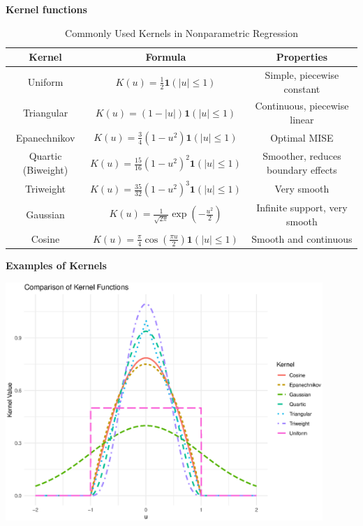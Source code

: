\documentclass[19pt,landscape]{article}
\begin{document}
\newpage
{\LARGE\centerline{\textbf{Kernel functions}}}
\vskip25pt
\begin{table}[h!]
    \centering
    \renewcommand{\arraystretch}{2} %
    \begin{tabular}{|c|c|c|}
        \hline
        \textbf{Kernel} & \textbf{Formula} & \textbf{Properties} \\
        \hline
        Uniform & \( K(u) = \frac{1}{2} \mathbf{1}(|u| \leq 1) \) & Simple, piecewise constant \\
        \hline
        Triangular & \( K(u) = (1 - |u|) \mathbf{1}(|u| \leq 1) \) & Continuous, piecewise linear \\
        \hline
        Epanechnikov & \( K(u) = \frac{3}{4} (1 - u^2) \mathbf{1}(|u| \leq 1) \) & Optimal MISE \\
        \hline
        Quartic (Biweight) & \( K(u) = \frac{15}{16} (1 - u^2)^2 \mathbf{1}(|u| \leq 1) \) & Smoother, reduces boundary effects \\
        \hline
        Triweight & \( K(u) = \frac{35}{32} (1 - u^2)^3 \mathbf{1}(|u| \leq 1) \) & Very smooth \\
        \hline
        Gaussian & \( K(u) = \frac{1}{\sqrt{2\pi}} \exp\left(-\frac{u^2}{2}\right) \) & Infinite support, very smooth \\
        \hline
        Cosine & \( K(u) = \frac{\pi}{4} \cos\left(\frac{\pi u}{2}\right) \mathbf{1}(|u| \leq 1) \) & Smooth and continuous \\
        \hline
    \end{tabular}
    \caption{Commonly Used Kernels in Nonparametric Regression}
    \label{tabkernels}
\end{table}

\newpage
{\LARGE{\textbf{Examples of Kernels}}}
\vskip25pt
   
\includegraphics[width=0.9\textwidth,height=0.5\textwidth]{kernel_comparison.eps}
\end{document}
